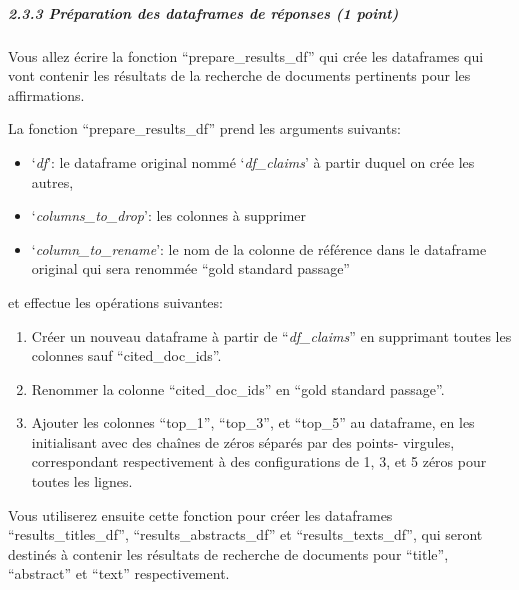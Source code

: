 \documentclass[11pt]{article}
\providecommand{\tightlist}{%
      \setlength{\itemsep}{0pt}\setlength{\parskip}{0pt}}
\begin{document}
    \subparagraph{2.3.3 Préparation des dataframes de réponses (1
point)}\label{pruxe9paration-des-dataframes-de-ruxe9ponses-1-point}

Vous allez écrire la fonction ``prepare\_results\_df'' qui crée les
dataframes qui vont contenir les résultats de la recherche de documents
pertinents pour les affirmations.

La fonction ``prepare\_results\_df'' prend les arguments suivants:

\begin{itemize}
\tightlist
\item
  `\emph{df}': le dataframe original nommé `\emph{df\_claims}' à partir
  duquel on crée les autres,
\item
  `\emph{columns\_to\_drop}': les colonnes à supprimer
\item
  `\emph{column\_to\_rename}': le nom de la colonne de référence dans le
  dataframe original qui sera renommée ``gold standard passage''
\end{itemize}

et effectue les opérations suivantes:

\begin{enumerate}
\def\labelenumi{\arabic{enumi}.}
\tightlist
\item
  Créer un nouveau dataframe à partir de ``\emph{df\_claims}'' en
  supprimant toutes les colonnes sauf ``cited\_doc\_ids''.
\item
  Renommer la colonne ``cited\_doc\_ids'' en ``gold standard passage''.
\item
  Ajouter les colonnes ``top\_1'', ``top\_3'', et ``top\_5'' au
  dataframe, en les initialisant avec des chaînes de zéros séparés par
  des points- virgules, correspondant respectivement à des
  configurations de 1, 3, et 5 zéros pour toutes les lignes.
\end{enumerate}

Vous utiliserez ensuite cette fonction pour créer les dataframes
``results\_titles\_df'', ``results\_abstracts\_df'' et
``results\_texts\_df'', qui seront destinés à contenir les résultats de
recherche de documents pour ``title'', ``abstract'' et ``text''
respectivement.
\end{document}
